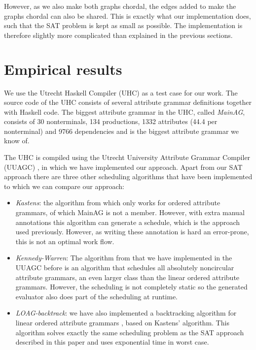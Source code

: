 \documentclass{llncs}
\begin{document}
However, as we also make both graphs chordal, the edges added to make the graphs chordal can also be shared. This is exactly what our implementation does, such that the SAT problem is kept as small as possible. The implementation is therefore slightly more complicated than explained in the previous sections.

\section{Empirical results} \label{sect:results}
We use the Utrecht Haskell Compiler (UHC) \cite{Dijkstra:2009} as a test case for our work. The source code of the UHC consists of several attribute grammar definitions together with Haskell code. The biggest attribute grammar in the UHC, called \emph{MainAG}, consists of 30 nonterminals, 134 productions, 1332 attributes (44.4 per nonterminal) and 9766 dependencies and is the biggest attribute grammar we know of.

The UHC is compiled using the Utrecht University Attribute Grammar Compiler (UUAGC) \cite{combinator-languages}, in which we have implemented our approach. Apart from our SAT approach there are three other scheduling algorithms that have been implemented to which we can compare our approach:

\begin{itemize}
\item \emph{Kastens}: the algorithm from \cite{kastens80} which only works for ordered attribute grammars, of which MainAG is not a member. However, with extra manual annotations this algorithm can generate a schedule, which is the approach used previously. However, as writing these annotation is hard an error-prone, this is not an optimal work flow.
\item \emph{Kennedy-Warren}: The algorithm from \cite{kennedywarren76} that we have implemented in the UUAGC before \cite{bransen2012} is an algorithm that schedules all absolutely noncircular attribute grammars, an even larger class than the linear ordered attribute grammars. However, the scheduling is not completely static so the generated evaluator also does part of the scheduling at runtime. 
\item \emph{LOAG-backtrack}: we have also implemented a backtracking algorithm for linear ordered attribute grammars \cite{Binsbergen:2015}, based on Kastens' algorithm. This algorithm solves exactly the same scheduling problem as the SAT approach described in this paper and uses exponential time in worst case.
\end{itemize} 
\end{document}
